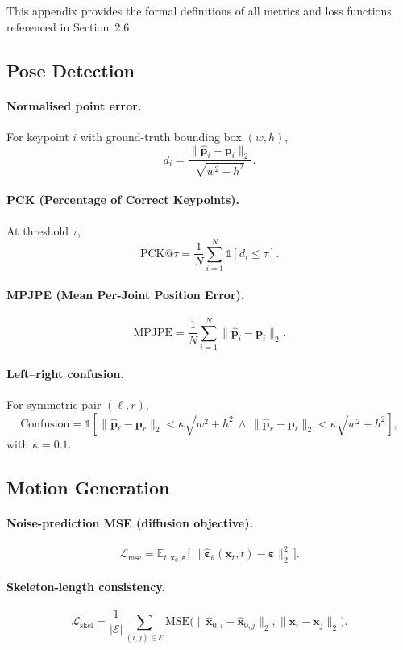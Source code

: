 \documentclass[final-report]{report-template}
\begin{document}
This appendix provides the formal definitions of all metrics and loss functions referenced in Section~2.6.

\subsection{Pose Detection}
\paragraph{Normalised point error.}
For keypoint $i$ with ground-truth bounding box $(w,h)$,
\[
d_i=\frac{\lVert \hat{\mathbf{p}}_i-\mathbf{p}_i\rVert_2}{\sqrt{w^2+h^2}} .
\]

\paragraph{PCK (Percentage of Correct Keypoints).}
At threshold $\tau$,
\[
\mathrm{PCK}@\tau=\frac{1}{N}\sum_{i=1}^{N}\mathbb{1}\!\left[d_i\le \tau\right].
\]

\paragraph{MPJPE (Mean Per-Joint Position Error).}
\[
\mathrm{MPJPE}=\frac{1}{N}\sum_{i=1}^{N}\lVert \hat{\mathbf{p}}_i-\mathbf{p}_i\rVert_2 .
\]

\paragraph{Left--right confusion.}
For symmetric pair $(\ell,r)$,
\[
\text{Confusion} = 
\mathbb{1}\!\left[\lVert \hat{\mathbf{p}}_\ell-\mathbf{p}_r\rVert_2<\kappa\sqrt{w^2+h^2}\,\wedge\,\lVert \hat{\mathbf{p}}_r-\mathbf{p}_\ell\rVert_2<\kappa\sqrt{w^2+h^2}\right],
\]
with $\kappa=0.1$.

\subsection{Motion Generation}
\paragraph{Noise-prediction MSE (diffusion objective).}
\[
\mathcal{L}_{\text{mse}}
=\mathbb{E}_{t,\mathbf{x}_0,\boldsymbol{\varepsilon}}\big[\,
\lVert \hat{\boldsymbol{\varepsilon}}_\theta(\mathbf{x}_t,t)-\boldsymbol{\varepsilon}\rVert_2^2
\,\big].
\]

\paragraph{Skeleton-length consistency.}
\[
\mathcal{L}_{\text{skel}}
=\frac{1}{|\mathcal{E}|}\sum_{(i,j)\in\mathcal{E}}
\mathrm{MSE}\!\Big(
\big\lVert \hat{\mathbf{x}}_{0,i}-\hat{\mathbf{x}}_{0,j}\big\rVert_2,
\big\lVert \mathbf{x}_{i}-\mathbf{x}_{j}\big\rVert_2
\Big).
\]
\end{document}
